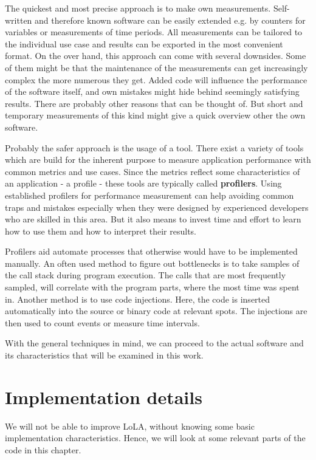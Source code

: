 The quickest and most precise approach is to make own measurements. Self-written and therefore known software can be easily extended e.g. by counters for variables or measurements of time periods. All measurements can be tailored to the individual use case and results can be exported in the most convenient format. On the over hand, this approach can come with several downsides. Some of them might be that the maintenance of the measurements can get increasingly complex the more numerous they get. Added code will influence the performance of the software itself, and own mistakes might hide behind seemingly satisfying results. There are probably other reasons that can be thought of. But short and temporary measurements of this kind might give a quick overview other the own software.

Probably the safer approach is the usage of a tool. There exist a variety of tools which are build for the inherent purpose to measure application performance with common metrics and use cases. Since the metrics reflect some characteristics of an application - a profile - these tools are typically called \textbf{profilers}. Using established profilers for performance measurement can help avoiding common traps and mistakes especially when they were designed by experienced developers who are skilled in this area. But it also means to invest time and effort to learn how to use them and how to interpret their results.

Profilers aid automate processes that otherwise would have to be implemented manually. An often used method to figure out bottlenecks is to take samples of the call stack during program execution. The calls that are most frequently sampled, will correlate with the program parts, where the most time was spent in. Another method is to use code injections. Here, the code is inserted automatically into the source or binary code at relevant spots. The injections are then used to count events or measure time intervals.

With the general techniques in mind, we can proceed to the actual software and its characteristics that will be examined in this work.

\section{Implementation details}
We will not be able to improve LoLA, without knowing some basic implementation characteristics. Hence, we will look at some relevant parts of the code in this chapter.


